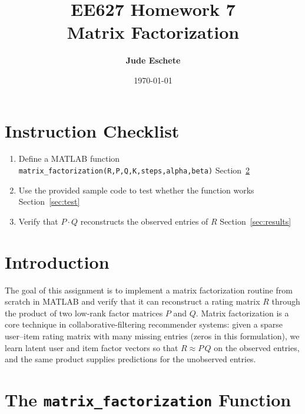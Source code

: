 \documentclass[12pt]{article}
\title{\textbf{EE627 Homework 7\\ Matrix Factorization}}
\author{\textbf{Jude Eschete}}
\date{\today}
\begin{document}
	\maketitle

	\newpage
	\section*{Instruction Checklist}

	\begin{enumerate}
		\item[\checkmark] Define a MATLAB function \texttt{matrix\_factorization(R,P,Q,K,steps,alpha,beta)} \dotfill Section~\ref{sec:function}
		\item[\checkmark] Use the provided sample code to test whether the function works \dotfill Section~\ref{sec:test}
		\item[\checkmark] Verify that $P\cdot Q$ reconstructs the observed entries of $R$ \dotfill Section~\ref{sec:results}
	\end{enumerate}

	\newpage
	\section{Introduction}

	The goal of this assignment is to implement a matrix factorization routine from scratch in MATLAB and verify that it can reconstruct a rating matrix $R$ through the product of two low-rank factor matrices $P$ and $Q$. Matrix factorization is a core technique in collaborative-filtering recommender systems: given a sparse user--item rating matrix with many missing entries (zeros in this formulation), we learn latent user and item factor vectors so that $R \approx P\,Q$ on the observed entries, and the same product supplies predictions for the unobserved entries.

	\newpage
	\section{The \texttt{matrix\_factorization} Function}\label{sec:function}
\end{document}
